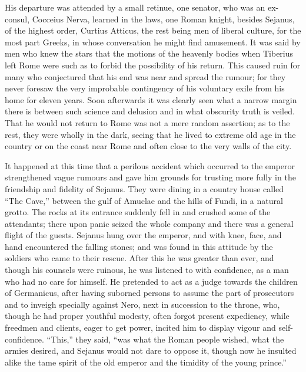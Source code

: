 
His departure was attended by a small retinue, one senator, who was an ex-consul, Cocceius Nerva, learned in the laws, one Roman knight, besides Sejanus, of the highest order, Curtius Atticus, the rest being men of liberal culture, for the most part Greeks, in whose conversation he might find amusement. It was said by men who knew the stars that the motions of the heavenly bodies when Tiberius left Rome were such as to forbid the possibility of his return. This caused ruin for many who conjectured that his end was near and spread the rumour; for they never foresaw the very improbable contingency of his voluntary exile from his home for eleven years. Soon afterwards it was clearly seen what a narrow margin there is between such science and delusion and in what obscurity truth is veiled. That he would not return to Rome was not a mere random assertion; as to the rest, they were wholly in the dark, seeing that he lived to extreme old age in the country or on the coast near Rome and often close to the very walls of the city.


It happened at this time that a perilous accident which occurred to the emperor strengthened vague rumours and gave him grounds for trusting more fully in the friendship and fidelity of Sejanus. They were dining in a country house called ``The Cave,'' between the gulf of Amuclae and the hills of Fundi, in a natural grotto. The rocks at its entrance suddenly fell in and crushed some of the attendants; there upon panic seized the whole company and there was a general flight of the guests. Sejanus hung over the emperor, and with knee, face, and hand encountered the falling stones; and was found in this attitude by the soldiers who came to their rescue. After this he was greater than ever, and though his counsels were ruinous, he was listened to with confidence, as a man who had no care for himself. He pretended to act as a judge towards the children of Germanicus, after having suborned persons to assume the part of prosecutors and to inveigh specially against Nero, next in succession to the throne, who, though he had proper youthful modesty, often forgot present expediency, while freedmen and clients, eager to get power, incited him to display vigour and self-confidence. ``This,'' they said, ``was what the Roman people wished, what the armies desired, and Sejanus would not dare to oppose it, though now he insulted alike the tame spirit of the old emperor and the timidity of the young prince.''


